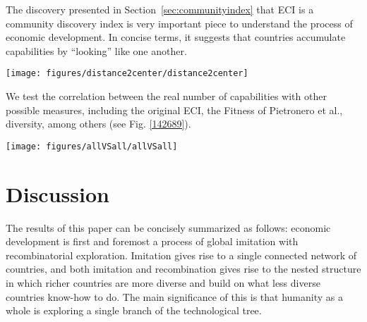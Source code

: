 \documentclass{pnastwo}
\begin{document}
\begin{article}
The discovery presented in Section~\ref{sec:communityindex} that ECI is a community discovery index is very important piece to understand the process of economic development. In concise terms, it suggests that countries accumulate capabilities by ``looking'' like one another.
\begin{figure*}[h]
\begin{center}
\texttt{[image: figures/distance2center/distance2center]}
\caption{{The real complexities is the number of capabilities that countries have
in their Cca matrix. The model we have used is Hausmann \& Hidalgo
(2011), but we have included 6 communities. The euclidean distance to
the center of the right-eigenspace is highly correlated with the real
number of capabilities
{\label{657592}}%
}}
\end{center}
\end{figure*}

We test the correlation between the real number of capabilities with
other possible measures, including the original ECI, the Fitness of
Pietronero et al., diversity, among others (see Fig.
{\ref{142689}}).
\begin{figure*}[h]
\begin{center}
\texttt{[image: figures/allVSall/allVSall]}
\caption{{Correlations scattergrams between pairs of variables that may estimate
the underlying number of capabilities. The best correlation is with~ the
``distance to the center'' of the right-eigenspace (see Fig.
{\ref{657592}}).
{\label{142689}}%
}}
\end{center}
\end{figure*}

\section{Discussion}

{\label{583331}}

The results of this paper can be concisely summarized as follows:
economic development is first and foremost a process of global imitation
with recombinatorial exploration. Imitation gives rise to a single
connected network of countries, and both imitation and recombination
gives rise to the nested structure in which richer countries are more
diverse and build on what less diverse countries know-how to do. The
main significance of this is that humanity as a whole is exploring a
single branch of the technological tree.~


\end{article}
\end{document}
